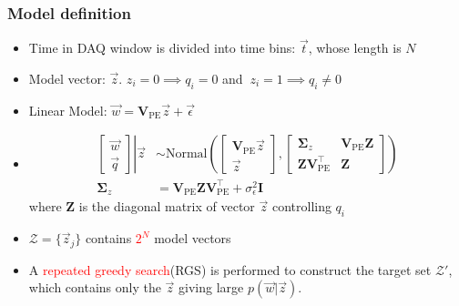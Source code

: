\documentclass{beamer}
\begin{document}
\begin{CJK*}{UTF8}{gbsn}
\begin{frame}
\frametitle{Model definition}
\begin{itemize}
    \item Time in DAQ window is divided into time bins: $\vec{t}$, whose length is $N$
    \item Model vector: $\vec{z}$. $z_i=0\implies q_i=0$ and $\ z_i=1\implies q_i\neq0$
    \item Linear Model: $\vec{w} = \bm{V}_\mathrm{PE}\vec{z} + \vec{\epsilon}$
    \item 
        \begin{align*}
            \left.
            \begin{bmatrix}
                \vec{w} \\
                \vec{q}
            \end{bmatrix}
            \right\vert\vec{z}
            &\sim \mathrm{Normal}\left(
            \begin{bmatrix}
                \bm{V}_\mathrm{PE}\vec{z} \\
                \vec{z}
            \end{bmatrix}, 
            \begin{bmatrix}
                \bm{\Sigma}_z & \bm{V}_\mathrm{PE}\bm{Z} \\
                \bm{Z}\bm{V}_\mathrm{PE}^\intercal & \bm{Z}
            \end{bmatrix}
            \right) \\
            \bm{\Sigma}_z &= \bm{V}_\mathrm{PE}\bm{Z}\bm{V}_\mathrm{PE}^\intercal+\sigma_\epsilon^2\bm{I}
        \end{align*}
    where $\bm{Z}$ is the diagonal matrix of vector $\vec{z}$ controlling $q_i$ 
    \item $\mathcal{Z}=\{\vec{z}_j\}$ contains \textcolor{red}{$2^{N}$} model vectors
    \item A \textcolor{red}{repeated greedy search}(RGS) is performed to construct the target set $\mathcal{Z}'$, which contains only the $\vec{z}$ giving large $p(\vec{w}|\vec{z})$. 
\end{itemize}
\end{frame}


\end{CJK*}
\end{document}
